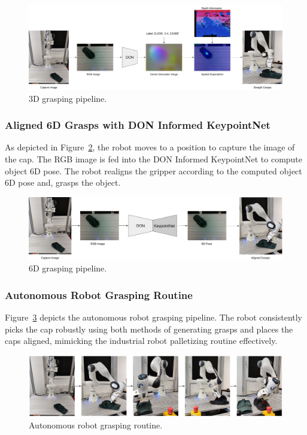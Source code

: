 \begin{figure}[htb]
    \centering
    \caption{3D grasping pipeline.}
    \label{fig:straight_grasp}
    \includegraphics[scale=0.15]{images/robot/straight_grasps.png}
\end{figure}


\subsubsection{Aligned 6D Grasps with \ac{DON} Informed KeypointNet}

As depicted in Figure~\ref{fig:aligned_grasps}, the robot moves to a position to capture the image of the cap. The \ac{RGB} image is fed into the \ac{DON} Informed KeypointNet to compute object 6D pose. The robot
realigns the gripper according to the computed object 6D pose and, grasps the object.

\begin{figure}[htb]
    \centering
    \caption{6D grasping pipeline.}
    \label{fig:aligned_grasps}
    \includegraphics[scale=0.15]{images/robot/aligned.png}
\end{figure}

\subsubsection{Autonomous Robot Grasping Routine}

Figure~\ref{fig:complete_pipeline} depicts the autonomous robot grasping pipeline.
The robot consistently picks the cap robustly using both methods of generating grasps and places the caps aligned, mimicking the industrial robot palletizing routine effectively.

\begin{figure}[htb]
    \centering
    \caption{Autonomous robot grasping routine.}
    \label{fig:complete_pipeline}
    \includegraphics[scale=0.15]{images/robot/cycle.png}
\end{figure}